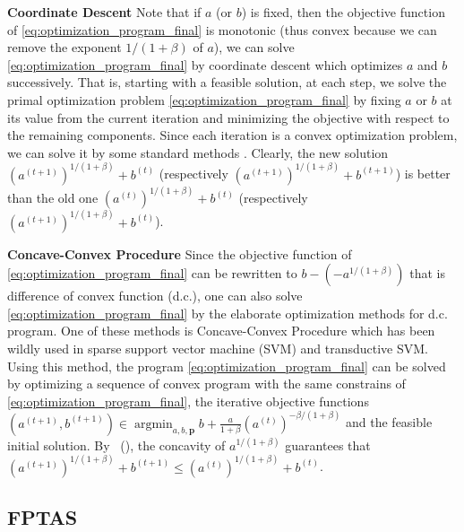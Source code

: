 \documentclass[letterpaper]{article} %
\newcommand{\probdistri}{\mathbf{p}}
\newcommand{\complexbound}{\beta}
\newcommand{\citet}[1]{\citeauthor{#1}\ (\citeyear{#1})}
\begin{document}
\textbf{Coordinate Descent} Note that if $a$ (or $b$) is fixed, then the objective function of \eqref{eq:optimization_program_final} is monotonic (thus convex because we can remove the exponent $1/(1+\complexbound{})$ of $a$), we can solve \eqref{eq:optimization_program_final} by coordinate descent which optimizes $a$ and $b$ successively. That is, starting with a feasible solution, at each step, we solve the primal optimization problem \eqref{eq:optimization_program_final} by fixing $a$ or $b$ at its value from the current iteration and minimizing the objective with respect to the remaining components.
Since each iteration is a convex optimization problem, we can solve it by some standard methods \cite{boyd2004convex}. Clearly, the new solution $(a^{(t+1)})^{1/(1+\complexbound{})} + b^{(t)}$ (respectively $(a^{(t+1)})^{1/(1+\complexbound{})} + b^{(t+1)}$) is better than the old one $(a^{(t)})^{1/(1+\complexbound{})} + b^{(t)}$ (respectively $(a^{(t+1)})^{1/(1+\complexbound{})} + b^{(t)}$).

\textbf{Concave-Convex Procedure} Since the objective function of \eqref{eq:optimization_program_final} can be rewritten to $b-(-a^{1/(1+\complexbound{})})$ that is difference of convex function (d.c.), one can also solve \eqref{eq:optimization_program_final} by the elaborate optimization methods for d.c. program. 
One of these methods is Concave-Convex Procedure \cite{Yuille2001The} which has been wildly used in sparse support vector machine (SVM) and transductive SVM. 
Using this method, the program \eqref{eq:optimization_program_final} can be solved by optimizing a sequence of convex program with the same constrains of \eqref{eq:optimization_program_final}, the iterative objective functions $(a^{(t+1)},b^{(t+1)})\in \mathop{\arg\min}_{a,b,\probdistri{}} b+\frac{a}{1+\complexbound{}}(a^{(t)})^{-\complexbound/(1+\complexbound{})}$
and the feasible initial solution. By \citet{lanckriet2009convergence}, the concavity of $a^{1/(1+\complexbound{})}$ guarantees that $(a^{(t+1)})^{1/(1+\complexbound{})} + b^{(t+1)}\le (a^{(t)})^{1/(1+\complexbound{})} + b^{(t)}$.

\subsection{FPTAS} %
\label{sub:ptas}
\end{document}
